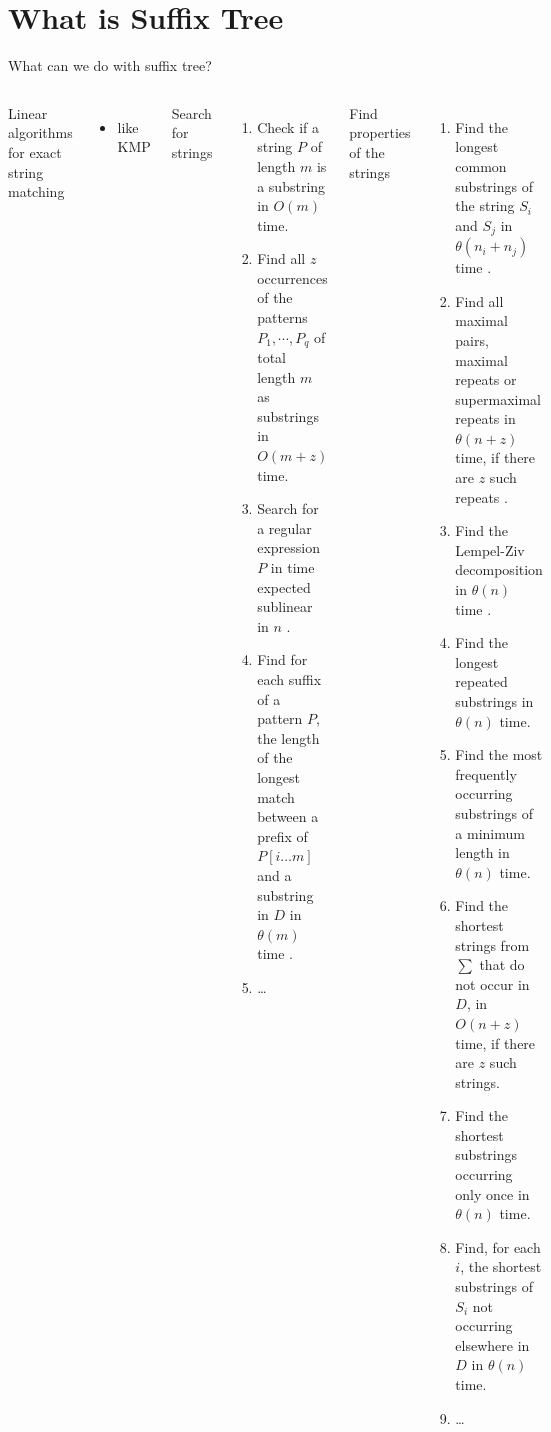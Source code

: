 

\section{What is Suffix Tree} 
\begin{frame}[shrink=25]{What can we do with suffix tree?}
\begin{columns}
\alert{Linear algorithms} for exact string matching
\begin{itemize}
\item like KMP
\end{itemize}

Search for strings
\begin{enumerate}
\item   Check if a string $P$ of length $m$ is a substring in $O(m)$ time.
\item   Find all $z$ occurrences of the patterns $P_1,\cdots,P_q$ of total 
length $m$ as substrings in $O(m + z)$ time.
\item   Search for a regular expression $P$ in time expected sublinear in $n$ .
\item   Find for each suffix of a pattern $P$, the length of the longest match 
between a prefix of $P[i\ldots m]$ and a substring in $D$ in $\theta(m)$ time .
\item \dots
\end{enumerate}

Find properties of the strings
\begin{enumerate}
\item   Find the longest common substrings of the string $S_i$ and $S_j$ 
in $\theta(n_i + n_j)$ time .
\item   \alert{Find all maximal pairs, maximal repeats or supermaximal repeats
 in $\theta(n + z)$ time, if there are $z$ such repeats .}
\item   Find the Lempel-Ziv decomposition in $\theta(n)$ time .
\item   Find the longest repeated substrings in $\theta(n)$ time.
\item   Find the most frequently occurring substrings of a minimum length in 
$\theta(n)$ time.
\item   Find the shortest strings from $\sum$ that do not occur in $D$, in 
$O(n + z)$ time, if there are $z$ such strings.
\item   Find the shortest substrings occurring only once in $\theta(n)$ time.
\item   Find, for each $i$, the shortest substrings of $S_i$ not occurring 
elsewhere in $D$ in $\theta(n)$ time.
\item \dots
\end{enumerate}
\end{columns}
\end{frame}

